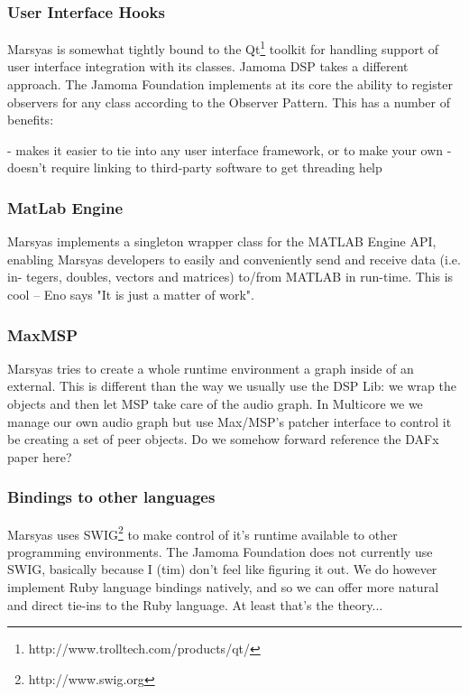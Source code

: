 \documentclass[twoside,10pt]{article}
\begin{document}
\subsubsection{User Interface Hooks}

Marsyas is somewhat tightly bound to the Qt\footnote{http://www.trolltech.com/products/qt/} toolkit for handling support of user interface integration with its classes.  Jamoma DSP takes a different approach.  The Jamoma Foundation implements at its core the ability to register observers for any class according to the Observer Pattern\cite{Gamma:1995}.  This has a number of benefits:

- makes it easier to tie into any user interface framework, or to make your own
- doesn't require linking to third-party software to get threading help

\subsubsection{MatLab Engine}

Marsyas implements a singleton wrapper class for the MATLAB Engine API, enabling Marsyas developers to easily and conveniently send and receive data (i.e. in- tegers, doubles, vectors and matrices) to/from MATLAB in run-time.  This is cool -- Eno says "It is just a matter of work".

\subsubsection{MaxMSP}

Marsyas tries to create a whole runtime environment a graph inside of an external.  This is different than the way we usually use the DSP Lib: we wrap the objects and then let MSP take care of the audio graph.  In Multicore we we manage our own audio graph but use Max/MSP's patcher interface to control it be creating a set of peer objects.  Do we somehow forward reference the DAFx paper here?

\subsubsection{Bindings to other languages}

Marsyas uses SWIG\footnote{http://www.swig.org} to make control of it's runtime available to other programming environments.  The Jamoma Foundation does not currently use SWIG, basically because I (tim) don't feel like figuring it out.  We do however implement Ruby language bindings natively, and so we can offer more natural and direct tie-ins to the Ruby language.  At least that's the theory...
\end{document}
